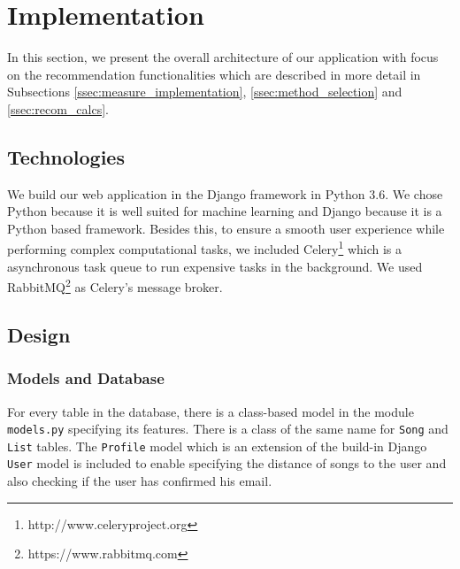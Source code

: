 \section{Implementation}\label{sec:implementation}
In this section, we present the overall architecture of our application with focus on the recommendation functionalities which are described in more detail in Subsections \ref{ssec:measure_implementation}, \ref{ssec:method_selection} and \ref{ssec:recom_calcs}. 

\subsection{Technologies}

We build our web application in the Django framework in Python 3.6. We chose Python because it is well suited for machine learning and Django because it is a Python based framework. Besides this, to ensure a smooth user experience while performing complex computational tasks, we included Celery\footnote{http://www.celeryproject.org} which is a asynchronous task queue to run expensive tasks in the background. We used RabbitMQ\footnote{https://www.rabbitmq.com} as Celery's message broker.

\subsection{Design}

\subsubsection{Models and Database}
For every table in the database, there is a class-based model in the module \texttt{models.py} specifying its features. There is a class of the same name for \texttt{Song} and \texttt{List} tables. The \texttt{Profile} model which is an extension of the build-in Django \texttt{User} model is included to enable specifying the distance of songs to the user and also checking if the user has confirmed his email.\\
 

